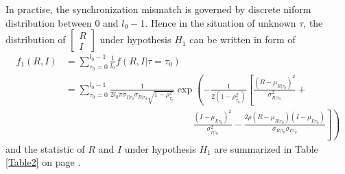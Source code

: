 In practise, the synchronization mismatch is governed by discrete niform distribution between $0$ and $l_0-1$. Hence in the situation of unknown $\tau$, the distribution of  
$\begin{bmatrix}
  R \\
  I
\end{bmatrix}$
under hypothesis $H_1$ can be written in form of 
\begin{equation}
  \begin{split}
  f_1(R, I) &= \sum_{\tau_0 = 0}^{l_0-1} \frac{1}{l_0}f(R, I|\tau=\tau_0)\\
  &= \sum_{\tau_0 = 0}^{l_0-1}\frac{1}{2l_0\pi\sigma_{I|\tau_0}\sigma_{R|\tau_0}\sqrt{1 - \rho_{\tau_0}^2}}\exp\left( -\frac{1}{2(1-\rho_{\tau_0}^2)}\left[ \frac{(R-\mu_{R|\tau_0})^2}{\sigma_{R|\tau_0}^2} + \right.\right.\\
  & \left. \left. \;\;\;\;\;\;\;\;\;\;\;\;\;\;\;\; \;\;\;\;\;\;\;\;\;\;\;\;\;\;\;\; \;\;\;\;\;\;\;\;\;\;\;\;\;\;\;\; \frac{(I-\mu_{I|\tau_0})^2}{\sigma_{I|\tau_0}^2} - \frac{2\rho(R-\mu_{R|\tau_0})(I-\mu_{I|\tau_0})}{\sigma_{R|\tau_0}\sigma_{I|\tau_0}}\right] \right)
\end{split}
  \label{f_1underH1}
\end{equation}
and the statistic of $R$ and $I$  under hypothesis $H_1$ are summarized in Table \ref{Table2} on page \pageref{Table2}.

